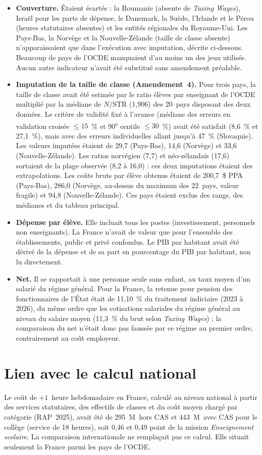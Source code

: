 \documentclass[11pt,a4paper]{article}
\providecommand{\euro}{\texteuro}
\begin{document}
\begin{itemize}
\item \textbf{Couverture.} Étaient écartés : la Roumanie (absente de \emph{Taxing Wages}), Israël pour les parts de dépense, le Danemark, la Suède, l'Irlande et le Pérou (heures statutaires absentes) et les entités régionales du Royaume-Uni. Les Pays-Bas, la Norvège et la Nouvelle-Zélande (taille de classe absente) n'apparaissaient que dans l'exécution avec imputation, décrite ci-dessous. Beaucoup de pays de l'OCDE manquaient d'au moins un des jeux utilisés. Aucun autre indicateur n'avait été substitué sans amendement préalable.
\item \textbf{Imputation de la taille de classe (Amendement~4).} Pour trois pays, la taille de classe avait été estimée par le ratio élèves par enseignant de l'OCDE multiplié par la médiane de $N/\mathrm{STR}$ (1,906) des 20~pays disposant des deux données. Le critère de validité fixé à l'avance (médiane des erreurs en validation croisée $\le 15$~\% et 90\textsuperscript{e} centile $\le 30$~\%) avait été satisfait (8,6~\% et 27,1~\%), mais avec des erreurs individuelles allant jusqu'à 47~\% (Slovaquie). Les valeurs imputées étaient de 29,7 (Pays-Bas), 14,6 (Norvège) et 33,6 (Nouvelle-Zélande). Les ratios norvégien (7,7) et néo-zélandais (17,6) sortaient de la plage observée (8,2 à 16,0) : ces deux imputations étaient des extrapolations. Les coûts bruts par élève obtenus étaient de 200,7~\$ PPA (Pays-Bas), 286,0 (Norvège, au-dessus du maximum des 22~pays, valeur fragile) et 94,8 (Nouvelle-Zélande). Ces pays étaient exclus des rangs, des médianes et du tableau principal.
\item \textbf{Dépense par élève.} Elle incluait tous les postes (investissement, personnels non enseignants). La France n'avait de valeur que pour l'ensemble des établissements, public et privé confondus. Le PIB par habitant avait été dérivé de la dépense et de sa part en pourcentage du PIB par habitant, non lu directement.
\item \textbf{Net.} Il se rapportait à une personne seule sans enfant, au taux moyen d'un salarié du régime général. Pour la France, la retenue pour pension des fonctionnaires de l'État était de 11,10~\% du traitement indiciaire (2023 à 2026), du même ordre que les cotisations salariales du régime général au niveau du salaire moyen (11,3~\% du brut selon \emph{Taxing Wages}) ; la comparaison du net n'était donc pas faussée par ce régime au premier ordre, contrairement au coût employeur.
\end{itemize}

\section{Lien avec le calcul national}
Le coût de $+1$~heure hebdomadaire en France, calculé au niveau national à partir des services statutaires, des effectifs de classes et du coût moyen chargé par catégorie (RAP~2025), avait été de 295~M\euro\  hors CAS et 443~M\euro\  avec CAS pour le collège (service de 18 heures), soit 0,46 et 0,49 point de la mission \emph{Enseignement scolaire}. La comparaison internationale ne remplaçait pas ce calcul. Elle situait seulement la France parmi les pays de l'OCDE.
\end{document}
